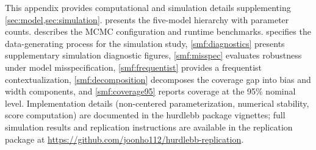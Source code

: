 
This appendix provides computational and simulation details supplementing
\cref{sec:model,sec:simulation}.   presents the
five-model hierarchy with parameter counts.   describes
the MCMC configuration and runtime benchmarks.   specifies
the data-generating process for the simulation study,
\cref{smf:diagnostics} presents supplementary simulation diagnostic
figures, \cref{smf:misspec} evaluates robustness under model
misspecification, \cref{smf:frequentist} provides a frequentist
contextualization, \cref{smf:decomposition} decomposes the coverage
gap into bias and width components, and \cref{smf:coverage95} reports
coverage at the 95\% nominal level.  Implementation details (non-centered parameterization,
numerical stability, score computation) are documented in the
\textsf{hurdlebb} package vignettes; full simulation results and
replication instructions are available in the replication package at
\url{https://github.com/joonho112/hurdlebb-replication}.
















